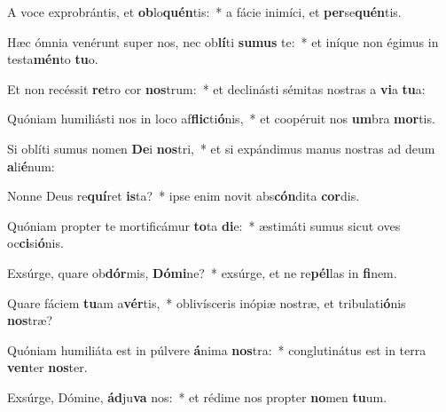 \item A voce exprobrántis, et \textbf{ob}lo\textbf{quén}tis:~* a fácie inimíci, et \textbf{per}se\textbf{quén}tis.
\item Hæc ómnia venérunt super nos, nec ob\textbf{lí}ti \textbf{su}\textbf{mus} te:~* et iníque non égimus in testa\textbf{mén}to \textbf{tu}o.
\item Et non recéssit \textbf{re}tro cor \textbf{nos}trum:~* et declinásti sémitas nostras a \textbf{vi}a \textbf{tu}a:
\item Quóniam humiliásti nos in loco af\textbf{flic}ti\textbf{ó}nis,~* et coopéruit nos \textbf{um}bra \textbf{mor}tis.
\item Si oblíti sumus nomen \textbf{De}i \textbf{nos}tri,~* et si expándimus manus nostras ad deum \textbf{a}li\textbf{é}num:
\item Nonne Deus re\textbf{quí}ret \textbf{is}ta?~* ipse enim novit abs\textbf{cón}dita \textbf{cor}dis.
\item Quóniam propter te mortificámur \textbf{to}ta \textbf{di}e:~* æstimáti sumus sicut oves oc\textbf{ci}si\textbf{ó}nis.
\item Exsúrge, quare ob\textbf{dór}mis, \textbf{Dó}\textbf{mi}ne?~* exsúrge, et ne re\textbf{pél}las in \textbf{fi}nem.
\item Quare fáciem \textbf{tu}am a\textbf{vér}tis,~* oblivísceris inópiæ nostræ, et tribulati\textbf{ó}nis \textbf{nos}træ?
\item Quóniam humiliáta est in púlvere \textbf{á}nima \textbf{nos}tra:~* conglutinátus est in terra \textbf{ven}ter \textbf{nos}ter.
\item Exsúrge, Dómine, \textbf{ád}ju\textbf{va} nos:~* et rédime nos propter \textbf{no}men \textbf{tu}um.
